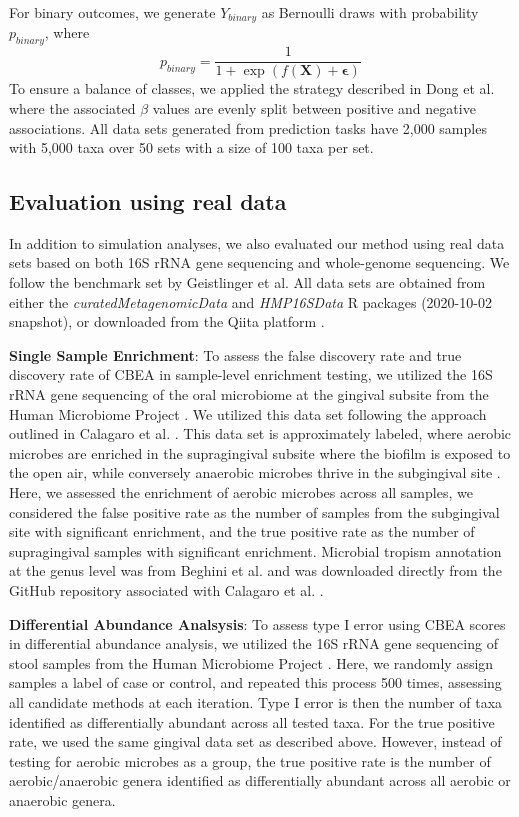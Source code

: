 \documentclass[10pt,letterpaper]{article}
\begin{document}
For binary outcomes, we generate $Y_{binary}$ as Bernoulli draws with probability $p_{binary}$, where 
\begin{equation}
    p_{binary} = \frac{1}{1 + \exp(f(\mathbf{X}) + \mathbf{\epsilon})}
\end{equation}
To ensure a balance of classes, we applied the strategy described in Dong et al. \cite{dong2020} where the associated $\beta$ values are evenly split between positive and negative associations. All data sets generated from prediction tasks have 2,000 samples with 5,000 taxa over 50 sets with a size of 100 taxa per set.  

\subsection*{Evaluation using real data}
In addition to simulation analyses, we also evaluated our method using real data sets based on both 16S rRNA gene sequencing and whole-genome sequencing. We follow the benchmark set by Geistlinger et al. \cite{geistlinger2021} All data sets are obtained from either the \emph{curatedMetagenomicData} \cite{pasolli2017} and \emph{HMP16SData} \cite{schiffer2019} R packages (2020-10-02 snapshot), or downloaded from the Qiita platform \cite{gonzalez2018}.  

\noindent \textbf{Single Sample Enrichment}: To assess the false discovery rate and true discovery rate of CBEA in sample-level enrichment testing, we utilized the 16S rRNA gene sequencing of the oral microbiome at the gingival subsite from the Human Microbiome Project \cite{consortium2012, proctor2019}. We utilized this data set following the approach outlined in Calagaro et al. \cite{calgaro2020}. This data set is approximately labeled, where aerobic microbes are enriched in the supragingival subsite where the biofilm is exposed to the open air, while conversely anaerobic microbes thrive in the subgingival site \cite{thurnheer2016}. Here, we assessed the enrichment of aerobic microbes across all samples, we considered the false positive rate as the number of samples from the subgingival site with significant enrichment, and the true positive rate as the number of supragingival samples with significant enrichment. Microbial tropism annotation at the genus level was from Beghini et al. \cite{beghini2019} and was downloaded directly from the GitHub repository associated with Calagaro et al. \cite{matteocalgaro2020}. 

\noindent \textbf{Differential Abundance Analsysis}: To assess type I error using CBEA scores in differential abundance analysis, we utilized the 16S rRNA gene sequencing of stool samples from the Human Microbiome Project \cite{consortium2012, proctor2019}. Here, we randomly assign samples a label of case or control, and repeated this process 500 times, assessing all candidate methods at each iteration. Type I error is then the number of taxa identified as differentially abundant across all tested taxa. For the true positive rate, we used the same gingival data set as described above. However, instead of testing for aerobic microbes as a group, the true positive rate is the number of aerobic/anaerobic genera identified as differentially abundant across all aerobic or anaerobic genera. 
\end{document}

